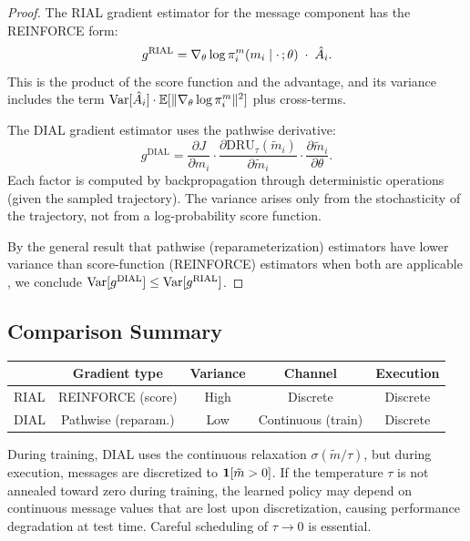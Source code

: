 \documentclass[11pt,a4paper]{article}
\begin{document}
\begin{proof}
The RIAL gradient estimator for the message component has the
REINFORCE form:
\[
  g^{\mathrm{RIAL}} = \nabla_\theta \log \pi_i^m(m_i \mid
  \cdot\,; \theta) \;\cdot\; \hat{A}_i.
\]
This is the product of the score function and the advantage,
and its variance includes the term $\operatorname{Var}[\hat{A}_i] \cdot
\mathbb{E}[\|\nabla_\theta \log \pi_i^m\|^2]$ plus cross-terms.

The DIAL gradient estimator uses the pathwise derivative:
\[
  g^{\mathrm{DIAL}} = \frac{\partial J}{\partial m_i}
  \cdot \frac{\partial \mathrm{DRU}_\tau(\tilde{m}_i)}
  {\partial \tilde{m}_i} \cdot \frac{\partial \tilde{m}_i}
  {\partial \theta}.
\]
Each factor is computed by backpropagation through deterministic
operations (given the sampled trajectory).  The variance arises
only from the stochasticity of the trajectory, not from a
log-probability score function.

By the general result that pathwise (reparameterization)
estimators have lower variance than score-function (REINFORCE)
estimators when both are applicable \citep{suttonbarto2018}, we
conclude $\operatorname{Var}[g^{\mathrm{DIAL}}] \leq \operatorname{Var}[g^{\mathrm{RIAL}}]$.
\end{proof}

\subsection{Comparison Summary}

\begin{center}
\begin{tabular}{lcccc}
\toprule
& \textbf{Gradient type} & \textbf{Variance} &
\textbf{Channel} & \textbf{Execution} \\
\midrule
RIAL & REINFORCE (score) & High & Discrete &
  Discrete \\
DIAL & Pathwise (reparam.) & Low & Continuous
  (train) & Discrete \\
\bottomrule
\end{tabular}
\end{center}

\begin{warning}
During training, DIAL uses the continuous relaxation
$\sigma(\tilde{m}/\tau)$, but during execution, messages are
discretized to $\mathbf{1}[\tilde{m} > 0]$.  If the temperature
$\tau$ is not annealed toward zero during training, the learned
policy may depend on continuous message values that are lost
upon discretization, causing performance degradation at test
time.  Careful scheduling of $\tau \to 0$ is essential.
\end{warning}
\end{document}
